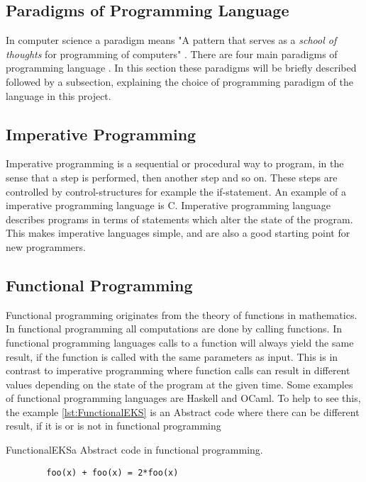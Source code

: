 \subsection{Paradigms of Programming Language}
In computer science 
a paradigm means "A pattern that serves as a \textit{school of thoughts} for programming of computers" \citep{ProgrammingParadigms2}. 
There are four main paradigms of programming language \citep{ProgrammingParadigms}. In this section these paradigms will be briefly described followed by a subsection, explaining the choice of programming paradigm of the language in this project.

\subsection{Imperative Programming}
Imperative programming is a sequential or procedural way to program, in the sense that a step is performed, then another step and so on. These steps are controlled by control-structures for example the if-statement. An example of a imperative programming language is C. Imperative programming language describes programs in terms of statements which alter the state of the program. This makes imperative languages simple, and are also a good starting point for new programmers.


\subsection{Functional Programming}
Functional programming originates from the theory of functions in mathematics. In functional programming all computations are done by calling functions. In functional programming languages calls to a function will always yield the same result, if the function is called with the same parameters as input. This is in contrast to imperative programming where function calls can result in different values depending on the state of the program at the given time. Some examples of functional programming languages are Haskell and OCaml. 
To help to see this, the example \ref{lst:FunctionalEKS} is an Abstract code where there can be different result, if it is or is not in functional programming

\begin{code}{FunctionalEKS}{a Abstract code in functional programming.}
	\begin{lstlisting}
		foo(x) + foo(x) = 2*foo(x)
	\end{lstlisting}
\end{code}

